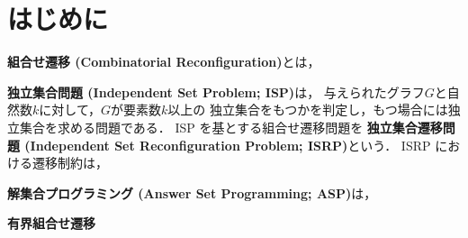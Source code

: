 \section{はじめに}\label{sec:introduction}

\textbf{組合せ遷移 (Combinatorial Reconfiguration)}とは，

\textbf{独立集合問題 (Independent Set Problem; ISP)}は，
与えられたグラフ$G$と自然数$k$に対して，$G$が要素数$k$以上の
独立集合をもつかを判定し，もつ場合には独立集合を求める問題である．
ISP を基とする組合せ遷移問題を
\textbf{独立集合遷移問題 (Independent Set Reconfiguration Problem; ISRP)}という．
ISRP における遷移制約は，

\textbf{解集合プログラミング (Answer Set Programming; ASP)}は，

\textbf{有界組合せ遷移}